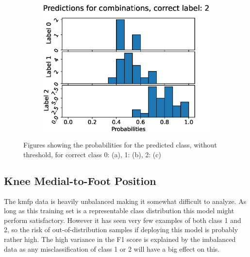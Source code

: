 \begin{figure}
\begin{subfigure}[t]{0.33\textwidth}
    \includegraphics[width=\textwidth]{files/figs/res/femval/pc2.eps}
    \caption{}
    \label{fig:femval-pc2}
  \end{subfigure}

  \caption{Figures showing the probabilities for the predicted class, without threshold, for correct class 0: (a), 1: (b), 2: (c)}
  \label{fig:femval-pc}
\end{figure}




\FloatBarrier
\subsection{Knee Medial-to-Foot Position}
The \gls{kmfp} data is heavily unbalanced making it somewhat difficult to analyze. As long as this training set is a representable class distribution this model might perform satisfactory. However it has seen very few examples of both class 1 and 2, so the risk of out-of-distribution samples if deploying this model is probably rather high. The high variance in the F1 score is explained by the imbalanced data as any misclassification of class 1 or 2 will have a big effect on this.

